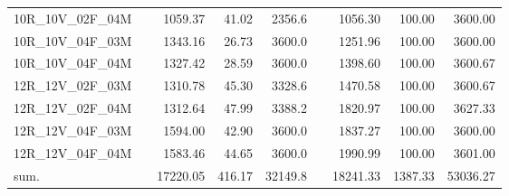 \begin{tabular}{llrrrlrrr}
10R\_10V\_02F\_04M & \hspace{0.1cm} & 1059.37 & 41.02 & 2356.6 & \hspace{0.2cm} & 1056.30 & 100.00 & 3600.00\\
10R\_10V\_04F\_03M & \hspace{0.1cm} & 1343.16 & 26.73 & 3600.0 & \hspace{0.2cm} & 1251.96 & 100.00 & 3600.00\\
10R\_10V\_04F\_04M & \hspace{0.1cm} & 1327.42 & 28.59 & 3600.0 & \hspace{0.2cm} & 1398.60 & 100.00 & 3600.67\\
\addlinespace
12R\_12V\_02F\_03M & \hspace{0.1cm} & 1310.78 & 45.30 & 3328.6 & \hspace{0.2cm} & 1470.58 & 100.00 & 3600.67\\
12R\_12V\_02F\_04M & \hspace{0.1cm} & 1312.64 & 47.99 & 3388.2 & \hspace{0.2cm} & 1820.97 & 100.00 & 3627.33\\
12R\_12V\_04F\_03M & \hspace{0.1cm} & 1594.00 & 42.90 & 3600.0 & \hspace{0.2cm} & 1837.27 & 100.00 & 3600.00\\
12R\_12V\_04F\_04M & \hspace{0.1cm} & 1583.46 & 44.65 & 3600.0 & \hspace{0.2cm} & 1990.99 & 100.00 & 3601.00\\
\addlinespace
sum. & \hspace{0.1cm} & 17220.05 & 416.17 & 32149.8 & \hspace{0.2cm} & 18241.33 & 1387.33 & 53036.27\\
\bottomrule
\end{tabular}
